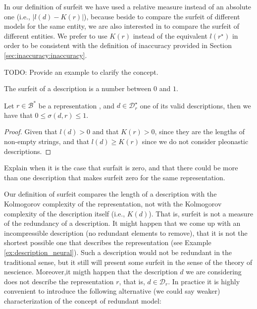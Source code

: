 In our definition of surfeit we have used a relative measure instead of an absolute one (i.e., $| l(d) - K(r) |$), because beside to compare the surfeit of different models for the same entity, we are also interested in to compare the surfeit of different entities. We prefer to use $K(r)$ instead of the equivalent $l \left( r^\star \right)$ in order to be consistent with the definition of inaccuracy provided in Section \ref{sec:inaccuracy:inaccuracy}.

\begin{example}
{\color{red} TODO: Provide an example to clarify the concept.}
\end{example}

The surfeit of a description is a number between $0$ and $1$.

\begin{proposition}
\label{prop:range_redundancy}
Let $r \in \mathcal{B}^\ast$ be a representation , and $d \in \mathcal{D}^\star_r$ one of its valid descriptions, then we have that $0 \leq \sigma(d, r) \leq 1$.
\end{proposition}
\begin{proof}
Given that $l\left( d \right)>0$ and that $K\left( r \right)>0$, since they are the lengths of non-empty strings, and that $l\left( d \right) \geq K\left( r \right)$ since we do not consider pleonastic descriptions.
\end{proof}

{\color{red} Explain when it is the case that surfait is zero, and that there could be more than one description that makes surfeit zero for the same representation.}

Our definition of surfeit compares the length of a description with the Kolmogorov complexity of the representation, not with the Kolmogorov complexity of the description itself (i.e., $K\left( d \right)$). That is, surfeit is not a measure of the redundancy of a description. It might happen that we come up with an incompressible description (no redundant elements to remove), that it is not the shortest possible one that describes the representation (see Example \ref{ex:description_neural}). Such a description would not be redundant in the traditional sense, but it still will present some surfeit in the sense of the theory of nescience. Moreover,it migth happen that the description $d$ we are considering does not describe the representation $r$, that is, $d \in \mathcal{D}_r$. In practice it is highly convenient to introduce the following alternative (we could say weaker) characterization of the concept of redundant model:

